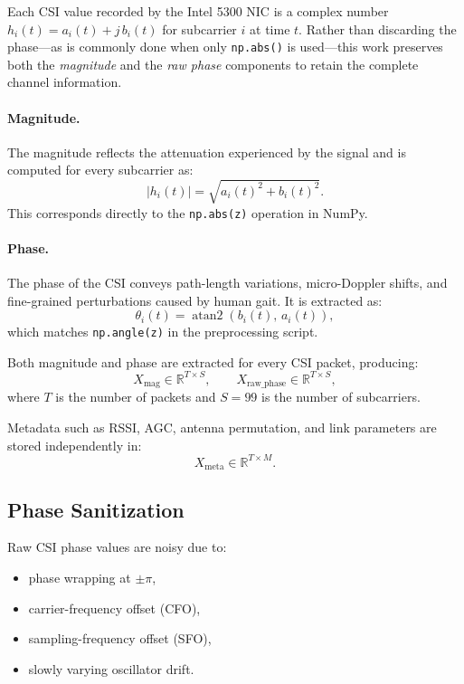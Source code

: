 Each CSI value recorded by the Intel 5300 NIC is a complex number
\(
h_i(t) = a_i(t) + j\,b_i(t)
\)
for subcarrier \(i\) at time \(t\). Rather than discarding the phase---as is
commonly done when only \texttt{np.abs()} is used---this work preserves both the
\emph{magnitude} and the \emph{raw phase} components to retain the complete
channel information.

\paragraph{Magnitude.}
The magnitude reflects the attenuation experienced by the signal and is computed
for every subcarrier as:
\[
|h_i(t)| = \sqrt{a_i(t)^2 + b_i(t)^2}.
\]
This corresponds directly to the \texttt{np.abs(z)} operation in NumPy.

\paragraph{Phase.}
The phase of the CSI conveys path-length variations, micro-Doppler shifts, and
fine-grained perturbations caused by human gait. It is extracted as:
\[
\theta_i(t) = \operatorname{atan2}(b_i(t),\,a_i(t)),
\]
which matches \texttt{np.angle(z)} in the preprocessing script.

Both magnitude and phase are extracted for every CSI packet, producing:
\[
X_{\text{mag}} \in \mathbb{R}^{T \times S}, 
\qquad
X_{\text{raw\_phase}} \in \mathbb{R}^{T \times S},
\]
where \(T\) is the number of packets and \(S=99\) is the number of
subcarriers.

Metadata such as RSSI, AGC, antenna permutation, and link parameters are stored
independently in:
\[
X_{\text{meta}} \in \mathbb{R}^{T \times M}.
\]

\subsection{Phase Sanitization}

Raw CSI phase values are noisy due to:
\begin{itemize}
    \item phase wrapping at \(\pm\pi\),
    \item carrier-frequency offset (CFO),
    \item sampling-frequency offset (SFO),
    \item slowly varying oscillator drift.
\end{itemize}

